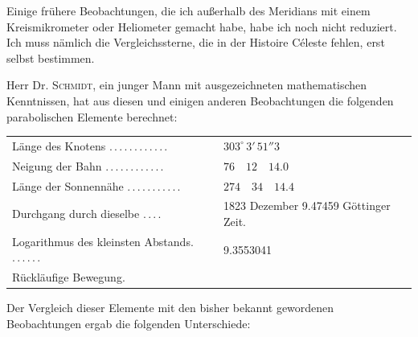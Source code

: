 Einige frühere Beobachtungen, die ich außerhalb des Meridians mit einem Kreismikrometer oder Heliometer gemacht habe, habe ich noch nicht reduziert. Ich muss nämlich die Vergleichssterne, die in der Histoire Céleste fehlen, erst selbst bestimmen.

Herr Dr. \textsc{Schmidt}, ein junger Mann mit ausgezeichneten mathematischen Kenntnissen, hat aus diesen und einigen anderen Beobachtungen die folgenden parabolischen Elemente berechnet:

\begin{center}
\begingroup\small
\begin{tabular}{p{.51\linewidth}p{.41\linewidth}}
Länge des Knotens \mbox{.\,.\,.\,.\,.\,.\,.\,.\,.\,.\,.\,.} & $303^\circ\,3'\,51''3$ \\
Neigung der Bahn \mbox{.\,.\,.\,.\,.\,.\,.\,.\,.\,.\,.\,.} & $76\quad12\quad14.0$ \\
Länge der Sonnennähe \mbox{.\,.\,.\,.\,.\,.\,.\,.\,.\,.\,.} & $274\quad34\quad14.4$ \\
Durchgang durch dieselbe \mbox{.\,.\,.\,.} & 1823 Dezember 9.47459 Göttinger Zeit. \\
Logarithmus des kleinsten Abstands. \mbox{.\,.\,.\,.\,.\,.} & 9.3553041 \\
\multicolumn{2}{l}{Rückläufige Bewegung.} \\
\end{tabular}
\endgroup
\end{center}

Der Vergleich dieser Elemente mit den bisher bekannt gewordenen Beobachtungen ergab die folgenden Unterschiede:




